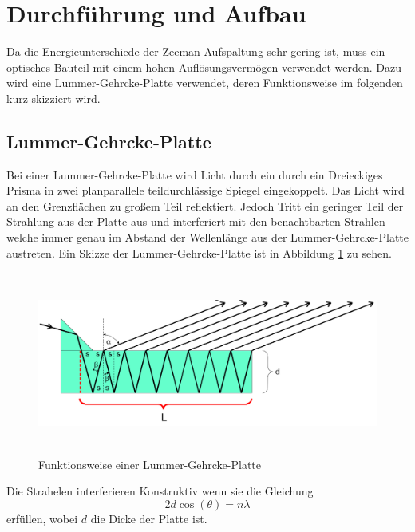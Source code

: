 \section{Durchführung und Aufbau}
\label{sec:Durchführung}

Da die Energieunterschiede der Zeeman-Aufspaltung sehr gering ist, muss ein optisches Bauteil mit einem hohen Auflösungsvermögen verwendet werden. Dazu wird eine Lummer-Gehrcke-Platte verwendet, deren Funktionsweise im folgenden kurz skizziert wird. 
\subsection{Lummer-Gehrcke-Platte}
Bei einer Lummer-Gehrcke-Platte wird Licht durch ein durch ein Dreieckiges Prisma in zwei planparallele teildurchlässige Spiegel eingekoppelt. Das Licht wird an den Grenzflächen zu großem Teil reflektiert. Jedoch Tritt ein geringer Teil der Strahlung aus der Platte aus und interferiert mit den benachtbarten Strahlen welche immer genau im Abstand der Wellenlänge aus der Lummer-Gehrcke-Platte austreten. Ein Skizze der Lummer-Gehrcke-Platte ist in Abbildung \ref{fig:Lum} zu sehen.

\begin{figure}[H]
  \centering
  \includegraphics[height=6cm]{Bilder/Lummer.png}
  \caption{Funktionsweise einer Lummer-Gehrcke-Platte \cite{V27}}
  \label{fig:Lum}
\end{figure}

Die Strahelen interferieren Konstruktiv wenn sie die Gleichung 
\begin{equation}
  2 d \cos(\theta) = n \lambda
  \label{}
\end{equation}
erfüllen, wobei $d$ die Dicke der Platte ist.


